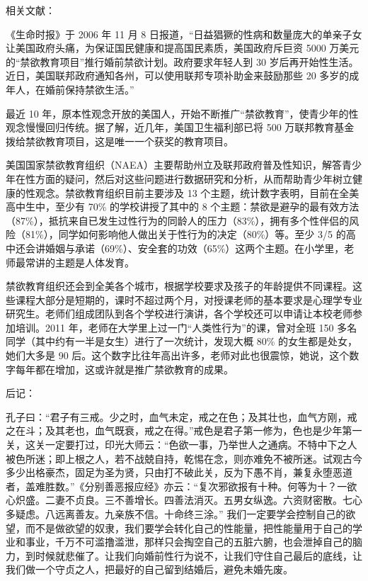 \documentclass[fontset=founder]{ctexart}
\begin{document}
相关文献：

《生命时报》于 2006 年 11 月 8 日报道，“日益猖獗的性病和数量庞大的单亲子女让美国政府头痛，为保证国民健康和提高国民素质，美国政府斥巨资 5000 万美元的“禁欲教育项目”推行婚前禁欲计划。政府要求年轻人到 30 岁后再开始性生活。近日，美国联邦政府通知各州，可以使用联邦专项补助金来鼓励那些 20 多岁的成年人，在婚前保持禁欲生活。”

最近 10 年，原本性观念开放的美国人，开始不断推广“禁欲教育”，使青少年的性观念慢慢回归传统。据了解，近几年，美国卫生福利部已将 500 万联邦教育基金拨给禁欲教育项目，这是唯一一个获奖的教育项目。

美国国家禁欲教育组织（NAEA）主要帮助州立及联邦政府普及性知识，解答青少年在性方面的疑问，然后对这些问题进行数据研究和分析，从而帮助青少年树立健康的性观念。禁欲教育组织目前主要涉及 13 个主题，统计数字表明，目前在全美高中生中，至少有 70\% 的学校讲授了其中的 8 个主题：禁欲是避孕的最有效方法（87\%），抵抗来自已发生过性行为的同龄人的压力（83\%），拥有多个性伴侣的风险（81\%），同学如何影响他人做出关于性行为的决定（80\%）等。至少 3/5 的高中还会讲婚姻与承诺（69\%）、安全套的功效（65\%）这两个主题。在小学里，老师最常讲的主题是人体发育。

禁欲教育组织还会到全美各个城市，根据学校要求及孩子的年龄提供不同课程。这些课程大部分是短期的，课时不超过两个月，对授课老师的基本要求是心理学专业研究生。老师们组成团队到各个学校进行演讲，各个学校还可以申请让本校老师参加培训。2011 年，老师在大学里上过一门“人类性行为”的课，曾对全班 150 多名同学（其中约有一半是女生）进行了一次统计，发现大概 80\% 的女生都是处女，她们大多是 90 后。这个数字比往年高出许多，老师对此也很震惊，她说，这个数字每年都在增加，这或许就是推广禁欲教育的成果。

后记：

孔子曰：“君子有三戒。少之时，血气未定，戒之在色；及其壮也，血气方刚，戒之在斗；及其老也，血气既衰，戒之在得。”戒色是君子第一修为，色也是少年第一关，这关一定要打过，印光大师云：“色欲一事，乃举世人之通病。不特中下之人被色所迷；即上根之人，若不战兢自持，乾惕在念，则亦难免不被所迷。试观古今多少出格豪杰，固足为圣为贤，只由打不破此关，反为下愚不肖，兼复永堕恶道者，盖难胜数。”《分别善恶报应经》亦云：“复次邪欲报有十种。何等为十？一欲心炽盛。二妻不贞良。三不善增长。四善法消灭。五男女纵逸。六资财密散。七心多疑虑。八远离善友。九亲族不信。十命终三涂。” 我们一定要学会控制自己的欲望，而不是做欲望的奴隶，我们要学会转化自己的性能量，把性能量用于自己的学业和事业，千万不可滥撸滥泄，那样只会掏空自己的五脏六腑，也会泄掉自己的脑力，到时候就悲催了。让我们向婚前性行为说不，让我们守住自己最后的底线，让我们做一个守贞之人，把最好的自己留到结婚后，避免未婚先废。
\end{document}
